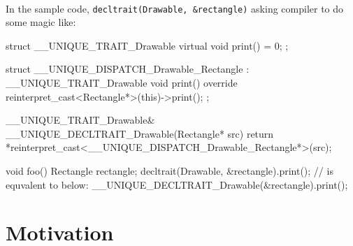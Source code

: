\documentclass{article}
\begin{document}
\paragraph{} In the sample code, \verb|decltrait(Drawable, &rectangle)| asking compiler to do some magic like:
\begin{codeblock}
struct __UNIQUE_TRAIT_Drawable {
  virtual void print() = 0;
};

struct __UNIQUE_DISPATCH_Drawable_Rectangle
  : __UNIQUE_TRAIT_Drawable {
  void print() override {
    reinterpret_cast<Rectangle*>(this)->print();
  }
};

__UNIQUE_TRAIT_Drawable& __UNIQUE_DECLTRAIT_Drawable(Rectangle* src) {
  return
    *reinterpret_cast<__UNIQUE_DISPATCH_Drawable_Rectangle*>(src); 
}

void foo(){
  Rectangle rectangle;
  decltrait(Drawable, &rectangle).print(); // is equvalent to below:
  __UNIQUE_DECLTRAIT_Drawable(&rectangle).print();
}

\end{codeblock}


\section{Motivation}
\end{document}
